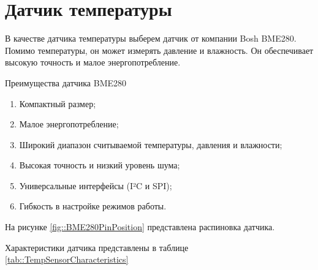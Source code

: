 \section {Датчик температуры}

В качестве датчика температуры выберем датчик от компании Bosh BME280.
Помимо температуры, он может измерять давление и влажность. Он обеспечивает высокую точность и малое энергопотребление.

Преимущества датчика BME280

\begin{enumerate}

    \item Компактный размер;
	
    \item Малое энергопотребление;
	
    \item Широкий диапазон считываемой температуры, давления и влажности;
    
    \item Высокая точность и низкий уровень шума;
 
    \item Универсальные интерфейсы (I²C и SPI);
    
    \item Гибкость в настройке режимов работы.
    
\end{enumerate}

На рисунке \ref{fig::BME280PinPosition} представлена распиновка датчика.


Характеристики датчика представлены в таблице \ref{tab::TempSensorCharacteristics}

